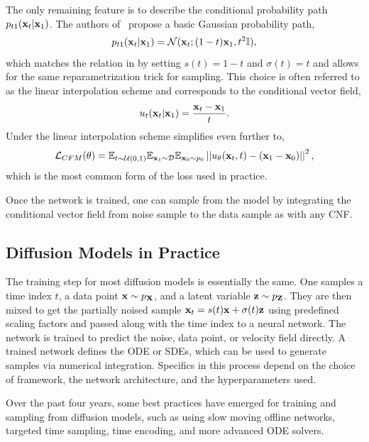 The only remaining feature is to describe the conditional probability path $p_{t1}(\mathbf{x}_t | \mathbf{x}_1)$.
The authors of~\cite{FlowStraightFast} propose a basic Gaussian probability path,
\begin{equation}
    \label{eq:conditional_gaussian}
    p_{t1}(\mathbf{x}_t | \mathbf{x}_1) = \mathcal{N}(\mathbf{x}_t; (1 - t)\mathbf{x}_1, t^2\mathbb{I}),
\end{equation}
which matches the relation in  by setting $s(t) = 1 - t$ and $\sigma(t) = t$ and allows for the same reparametrization trick for sampling.
This choice is often referred to as the linear interpolation scheme and corresponds to the conditional vector field,
\begin{equation}
    \label{eq:conditional_gaussian_field}
    u_t(\mathbf{x}_t | \mathbf{x}_1) = \frac{\mathbf{x}_t-\mathbf{x}_1}{t}.
\end{equation}
Under the linear interpolation scheme  simplifies even further to,
\begin{equation}
    \label{eq:linear_cfm_loss}
    \mathcal{L}_{CFM}(\theta) =
    \mathbb{E}_{t \sim \mathcal{U}(0, 1)}
    \mathbb{E}_{\mathbf{x}_1 \sim \mathcal{D}}
    \mathbb{E}_{\mathbf{x}_0 \sim p_0}
    \left|\left|u_\theta(\mathbf{x}_t, t) - (\mathbf{x}_1 - \mathbf{x}_0)\right|\right|^2,
\end{equation}
which is the most common form of the loss used in practice.

Once the network is trained, one can sample from the model by integrating the conditional vector field from noise sample to the data sample as with any \Gls{CNF}.

\subsection{Diffusion Models in Practice}

The training step for most diffusion models is essentially the same.
One samples a time index $t$, a data point $\mathbf{x} \sim p_{\mathbf{X}}$, and a latent variable $\mathbf{z} \sim p_{\mathbf{Z}}$.
They are then mixed to get the partially noised sample $\mathbf{x}_t = s(t)\mathbf{x} + \sigma(t)\mathbf{z}$ using predefined scaling factors and passed along with the time index to a neural network.
The network is trained to predict the noise, data point, or velocity field directly.
A trained network defines the \Gls{ODE} or \Glspl{SDE}, which can be used to generate samples via numerical integration.
Specifics in this process depend on the choice of framework, the network architecture, and the hyperparameters used.

Over the past four years, some best practices have emerged for training and sampling from diffusion models, such as using slow moving offline networks, targeted time sampling, time encoding, and more advanced \Gls{ODE} solvers.

